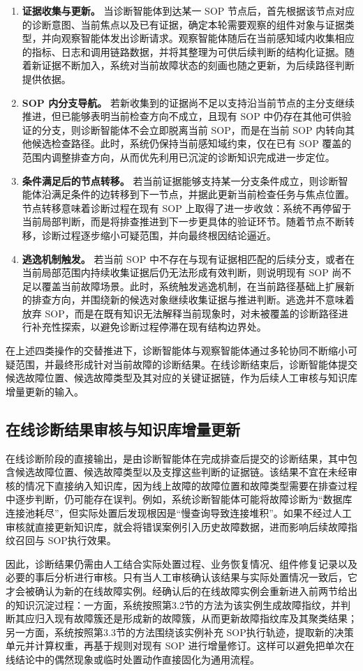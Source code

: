 \begin{enumerate}[label=（\arabic*）]
    \item \textbf{证据收集与更新。}
    当诊断智能体到达某一 SOP 节点后，首先根据该节点对应的诊断意图、当前焦点以及已有证据，确定本轮需要观察的组件对象与证据类型，并向观察智能体发出诊断请求。观察智能体随后在当前感知域内收集相应的指标、日志和调用链路数据，并将其整理为可供后续判断的结构化证据。随着新证据不断加入，系统对当前故障状态的刻画也随之更新，为后续路径判断提供依据。

    \item \textbf{SOP 内分支导航。}
    若新收集到的证据尚不足以支持沿当前节点的主分支继续推进，但已能够表明当前检查方向不成立，且现有 SOP 中仍存在其他可供验证的分支，则诊断智能体不会立即脱离当前 SOP，而是在当前 SOP 内转向其他候选检查路径。此时，系统仍保持当前感知域约束，仅在已有 SOP 覆盖的范围内调整排查方向，从而优先利用已沉淀的诊断知识完成进一步定位。

    \item \textbf{条件满足后的节点转移。}
    若当前证据能够支持某一分支条件成立，则诊断智能体沿满足条件的边转移到下一节点，并据此更新当前检查任务与焦点位置。节点转移意味着诊断过程在现有 SOP 上取得了进一步收敛：系统不再停留于当前局部判断，而是将排查推进到下一步更具体的验证环节。随着节点不断转移，诊断过程逐步缩小可疑范围，并向最终根因结论逼近。

    \item \textbf{逃逸机制触发。}
    若当前 SOP 中不存在与现有证据相匹配的后续分支，或者在当前局部范围内持续收集证据后仍无法形成有效判断，则说明现有 SOP 尚不足以覆盖当前故障场景。此时，系统触发逃逸机制，在当前路径基础上扩展新的排查方向，并围绕新的候选对象继续收集证据与推进判断。逃逸并不意味着放弃 SOP，而是在既有知识无法解释当前现象时，对未被覆盖的诊断路径进行补充性探索，以避免诊断过程停滞在现有结构边界处。
\end{enumerate}

在上述四类操作的交替推进下，诊断智能体与观察智能体通过多轮协同不断缩小可疑范围，并最终形成针对当前故障的诊断结果。在线诊断结束后，诊断智能体提交候选故障位置、候选故障类型及其对应的关键证据链，作为后续人工审核与知识库增量更新的输入。

\subsection{在线诊断结果审核与知识库增量更新}

在线诊断阶段的直接输出，是由诊断智能体在完成排查后提交的诊断结果，其中包含候选故障位置、候选故障类型以及支撑这些判断的证据链。该结果不宜在未经审核的情况下直接纳入知识库，因为线上故障的故障位置和故障类型需要在排查过程中逐步判断，仍可能存在误判。例如，系统诊断智能体可能将故障诊断为“数据库连接池耗尽”，但实际处置后发现根因是“慢查询导致连接堆积”。如果不经过人工审核就直接更新知识库，就会将错误案例引入历史故障数据，进而影响后续故障指纹召回与 SOP执行效果。

因此，诊断结果仍需由人工结合实际处置过程、业务恢复情况、组件修复记录以及必要的事后分析进行审核。只有当人工审核确认该结果与实际处置情况一致后，它才会被确认为新的在线故障实例。经确认后的在线故障实例会重新进入前两节给出的知识沉淀过程：一方面，系统按照第3.2节的方法为该实例生成故障指纹，并判断其应归入现有故障簇还是形成新的故障簇，从而更新故障指纹库及其聚类结果；另一方面，系统按照第3.3节的方法围绕该实例补充 SOP执行轨迹，提取新的决策单元并计算权重，再基于规则对现有 SOP 进行增量修订。这样可以避免把单次在线结论中的偶然现象或临时处置动作直接固化为通用流程。
